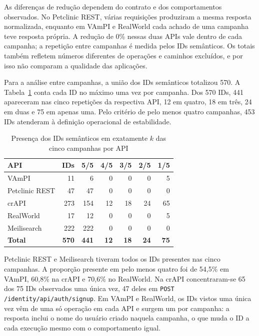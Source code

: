 As diferenças de redução dependem do contrato e dos comportamentos observados.
No Petclinic REST, várias requisições produziram a mesma resposta
normalizada, enquanto em VAmPI e RealWorld cada achado de uma campanha teve
resposta própria. A redução de 0\% nessas duas APIs vale dentro de cada
campanha; a repetição entre campanhas é medida pelos IDs semânticos. Os totais
também refletem números diferentes de operações e caminhos excluídos, e por
isso não comparam a qualidade das aplicações.

Para a análise entre campanhas, a união dos IDs semânticos totalizou 570.
A Tabela~\ref{tab:presenca-final} conta cada ID no máximo uma vez por campanha.
Dos 570 IDs, 441 apareceram nas cinco repetições da respectiva API, 12 em quatro,
18 em três, 24 em duas e 75 em apenas uma. Pelo critério de pelo menos quatro
campanhas, 453 IDs atenderam à definição operacional de estabilidade.

\begin{table}[H]
\centering
\caption{Presença dos IDs semânticos em exatamente $k$ das cinco campanhas por API}
\label{tab:presenca-final}
\small
\begin{tabular}{|l|r|r|r|r|r|r|}
\hline
\textbf{API} & \textbf{IDs} & \textbf{5/5} & \textbf{4/5} & \textbf{3/5} & \textbf{2/5} & \textbf{1/5} \\ \hline
VAmPI & 11 & 6 & 0 & 0 & 0 & 5 \\ \hline
Petclinic REST & 47 & 47 & 0 & 0 & 0 & 0 \\ \hline
crAPI & 273 & 154 & 12 & 18 & 24 & 65 \\ \hline
RealWorld & 17 & 12 & 0 & 0 & 0 & 5 \\ \hline
Meilisearch & 222 & 222 & 0 & 0 & 0 & 0 \\ \hline
\textbf{Total} & \textbf{570} & \textbf{441} & \textbf{12} & \textbf{18} & \textbf{24} & \textbf{75} \\ \hline
\end{tabular}
\end{table}

Petclinic REST e Meilisearch tiveram todos os IDs presentes nas cinco campanhas.
A proporção presente em pelo menos quatro foi de 54,5\% em VAmPI, 60,8\% na
crAPI e 70,6\% no RealWorld. Na crAPI concentraram-se 65 dos 75 IDs observados
uma única vez, 47 deles em \texttt{POST /identity/api/auth/signup}. Em VAmPI e
RealWorld, os IDs vistos uma única vez vêm de uma só operação em cada API e
surgem um por campanha: a resposta inclui o nome do usuário criado naquela
campanha, o que muda o ID a cada execução mesmo com o comportamento igual.

